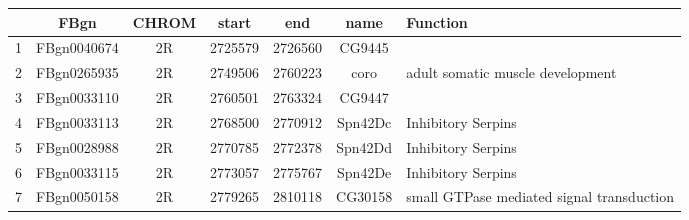 \centering \begin{tabular}{c|c|c|c|c|c | p{2in}}
	&FBgn	&CHROM	&start	&end	&name & Function\\\hline
1	&FBgn0040674	&2R	&2725579	&2726560	&CG9445\\
2	&FBgn0265935	&2R	&2749506	&2760223	&coro & adult somatic muscle 
development\\
3	&FBgn0033110	&2R	&2760501	&2763324	&CG9447\\
4	&FBgn0033113	&2R	&2768500	&2770912	&Spn42Dc& Inhibitory Serpins\\
5	&FBgn0028988	&2R	&2770785	&2772378	&Spn42Dd& Inhibitory Serpins\\
6	&FBgn0033115	&2R	&2773057	&2775767	&Spn42De& Inhibitory Serpins \\
7	&FBgn0050158	&2R	&2779265	&2810118	&CG30158 & small GTPase 
mediated signal transduction
\end{tabular}
